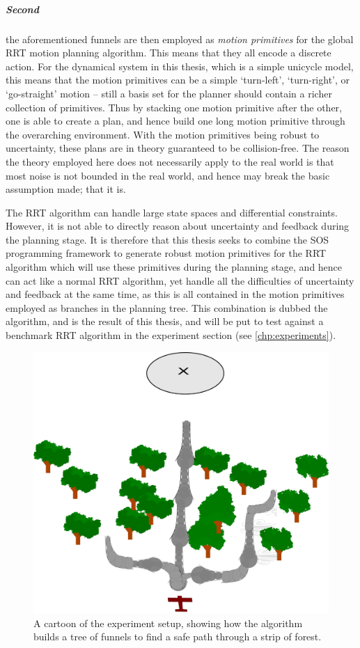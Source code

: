 \subparagraph{Second} the aforementioned funnels are then employed as
\textit{motion primitives} for the global \ac{RRT} motion planning algorithm.
This means that they all encode a discrete action. For the dynamical system in
this thesis, which is a simple unicycle model, this means that the motion
primitives can be a simple `turn-left', `turn-right', or `go-straight' motion --
still a basis set for the planner should contain a richer collection of
primitives. Thus by stacking one motion primitive after the other, one is able
to create a plan, and hence build one long motion primitive through the
overarching environment. With the motion primitives being robust to uncertainty,
these plans are in theory guaranteed to be collision-free. The reason the theory
employed here does not necessarily apply to the real world is that most noise is
not bounded in the real world, and hence may break the basic assumption made;
that it is.

The \ac{RRT} algorithm can handle large state spaces and differential
constraints. However, it is not able to directly reason about uncertainty and
feedback during the planning stage. It is therefore that this thesis seeks to
combine the \ac{SOS} programming framework to generate robust motion primitives
for the \ac{RRT} algorithm which will use these primitives during the planning
stage, and hence can act like a normal \ac{RRT} algorithm, yet handle all the
difficulties of uncertainty and feedback at the same time, as this is all
contained in the motion primitives employed as branches in the planning tree.
This combination is dubbed the \rrtfunnel{} algorithm, and is the result of this
thesis, and will be put to test against a benchmark \ac{RRT} algorithm in the
experiment section (see \cref{chp:experiments}).

\begin{figure}
  \centering
  \includegraphics[scale=.1]{figures/experiments/experiment-airplane-strip}
  \caption{A cartoon of the experiment setup, showing how the \rrtfunnel{}
    algorithm builds a tree of funnels to find a safe path through a strip of
    forest.}
  \label{fig:experiments-cartoon}
\end{figure}

